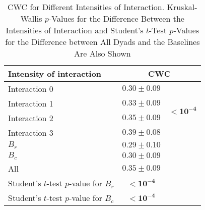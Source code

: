 \begin{table}[!t]
\caption{CWC for Different Intensities of Interaction. Kruskal-Wallis $p$-Values for the Difference Between the Intensities of Interaction and Student's $t$-Test $p$-Values for the Difference between All Dyads and the Baselines Are Also Shown\label{tab:coherence_interaction}}
\begin{tabular}{lcc}
\toprule
Intensity of interaction & \multicolumn{2}{c}{CWC} \\
\midrule
Interaction 0 & $0.30 \pm 0.09$ & \multirow{4}{*}{$\mathbf{< 10^{-4}}$} \\
Interaction 1 & $0.33 \pm 0.09$ & \\
Interaction 2 & $0.35 \pm 0.09$ & \\
Interaction 3 & $0.39 \pm 0.08$ & \\
\midrule
$B_r$ & $0.29 \pm 0.10$ & \\
$B_c$ & $0.30 \pm 0.09$ & \\
\midrule
All & $0.35 \pm 0.09$ & \\
\midrule
Student's $t$-test $p$-value for $B_r$ & $\mathbf{< 10^{-4}}$  &\\
Student's $t$-test $p$-value for $B_c$ & $\mathbf{< 10^{-4}}$ &\\
\bottomrule
\end{tabular}
\end{table}
